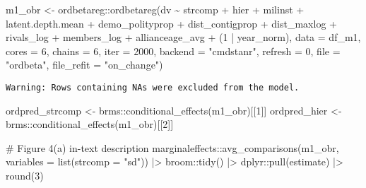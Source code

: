 \documentclass[
  12,
  letterpaper,
  DIV=11,
  numbers=noendperiod]{scrartcl}
\newenvironment{Shaded}{\begin{snugshade}}{\end{snugshade}}
\newcommand{\AttributeTok}[1]{\textcolor[rgb]{0.40,0.45,0.13}{#1}}
\newcommand{\CommentTok}[1]{\textcolor[rgb]{0.37,0.37,0.37}{#1}}
\newcommand{\DecValTok}[1]{\textcolor[rgb]{0.68,0.00,0.00}{#1}}
\newcommand{\FunctionTok}[1]{\textcolor[rgb]{0.28,0.35,0.67}{#1}}
\newcommand{\NormalTok}[1]{\textcolor[rgb]{0.00,0.23,0.31}{#1}}
\newcommand{\OtherTok}[1]{\textcolor[rgb]{0.00,0.23,0.31}{#1}}
\newcommand{\SpecialCharTok}[1]{\textcolor[rgb]{0.37,0.37,0.37}{#1}}
\newcommand{\StringTok}[1]{\textcolor[rgb]{0.13,0.47,0.30}{#1}}
\begin{document}
\begin{Shaded}
\begin{Highlighting}[numbers=left,,]
\NormalTok{m1\_obr }\OtherTok{\textless{}{-}}\NormalTok{ ordbetareg}\SpecialCharTok{::}\FunctionTok{ordbetareg}\NormalTok{(dv }\SpecialCharTok{\textasciitilde{}} 
\NormalTok{                                   strcomp }\SpecialCharTok{+}\NormalTok{ hier }\SpecialCharTok{+} 
\NormalTok{                                   milinst }\SpecialCharTok{+}\NormalTok{ latent.depth.mean }\SpecialCharTok{+}\NormalTok{ demo\_polityprop }\SpecialCharTok{+}\NormalTok{ dist\_contigprop }\SpecialCharTok{+}\NormalTok{ dist\_maxlog }\SpecialCharTok{+}\NormalTok{ rivals\_log }\SpecialCharTok{+}\NormalTok{ members\_log }\SpecialCharTok{+}\NormalTok{ allianceage\_avg }\SpecialCharTok{+}
\NormalTok{                                   (}\DecValTok{1} \SpecialCharTok{|}\NormalTok{ year\_norm),}
                                 \AttributeTok{data =}\NormalTok{ df\_m1,}
                                 \AttributeTok{cores =} \DecValTok{6}\NormalTok{,}
                                 \AttributeTok{chains =} \DecValTok{6}\NormalTok{,}
                                 \AttributeTok{iter =} \DecValTok{2000}\NormalTok{,}
                                 \AttributeTok{backend =} \StringTok{"cmdstanr"}\NormalTok{,}
                                 \AttributeTok{refresh =} \DecValTok{0}\NormalTok{,}
                                 \AttributeTok{file =} \StringTok{"ordbeta"}\NormalTok{,}
                                 \AttributeTok{file\_refit =} \StringTok{"on\_change"}\NormalTok{)}
\end{Highlighting}
\end{Shaded}

\begin{verbatim}
Warning: Rows containing NAs were excluded from the model.
\end{verbatim}

\begin{Shaded}
\begin{Highlighting}[numbers=left,,]
\NormalTok{ordpred\_strcomp }\OtherTok{\textless{}{-}}\NormalTok{ brms}\SpecialCharTok{::}\FunctionTok{conditional\_effects}\NormalTok{(m1\_obr)[[}\DecValTok{1}\NormalTok{]]}
\NormalTok{ordpred\_hier }\OtherTok{\textless{}{-}}\NormalTok{ brms}\SpecialCharTok{::}\FunctionTok{conditional\_effects}\NormalTok{(m1\_obr)[[}\DecValTok{2}\NormalTok{]]}

\CommentTok{\# Figure 4(a) in{-}text description}
\NormalTok{marginaleffects}\SpecialCharTok{::}\FunctionTok{avg\_comparisons}\NormalTok{(m1\_obr, }\AttributeTok{variables =} \FunctionTok{list}\NormalTok{(}\AttributeTok{strcomp =} \StringTok{"sd"}\NormalTok{)) }\SpecialCharTok{|\textgreater{}}\NormalTok{ broom}\SpecialCharTok{::}\FunctionTok{tidy}\NormalTok{() }\SpecialCharTok{|\textgreater{}}\NormalTok{ dplyr}\SpecialCharTok{::}\FunctionTok{pull}\NormalTok{(estimate) }\SpecialCharTok{|\textgreater{}} \FunctionTok{round}\NormalTok{(}\DecValTok{3}\NormalTok{)}
\end{Highlighting}
\end{Shaded}
\end{document}
